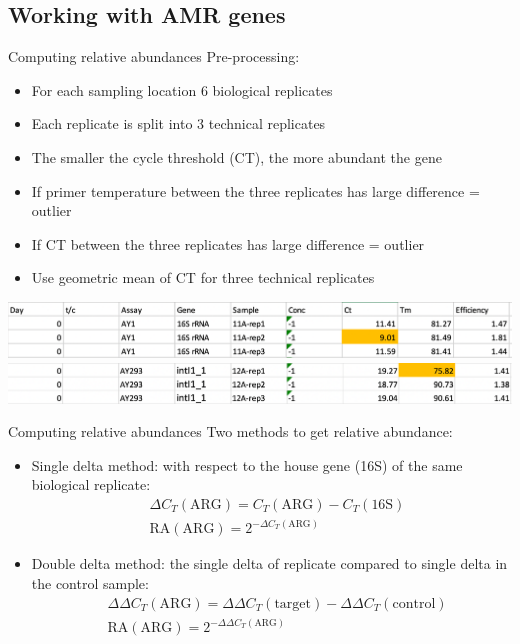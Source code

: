 \documentclass[mathserif,11pt]{beamer}
\begin{document}
\subsection{Working with AMR genes}
\begin{frame}{Computing relative abundances}
Pre-processing:
\begin{itemize}
	\item For each sampling location 6 biological replicates
	\item Each replicate is split into 3 technical replicates
	\item The smaller the cycle threshold (CT), the more abundant the gene
	\item If primer temperature between the three replicates has large difference = outlier
	\item If CT between the three replicates has large difference = outlier
	\item Use geometric mean of CT for three technical replicates
\end{itemize}
\includegraphics[width=\textwidth]{Figures/example_rtpcr.png}
\includegraphics[width=\textwidth]{Figures/example_rtpcr_tm.png}
\end{frame}
\begin{frame}{Computing relative abundances}
Two methods to get relative abundance:
	\begin{itemize}
	\item Single delta method: with respect to the house gene (16S) of the same biological replicate:	
			\begin{align*}
			&\Delta C_{T}(\text{ARG}) = C_{T}(\text{ARG}) - C_{T}(\text{16S})\\
			& \text{RA}(\text{ARG}) = 2^{-\Delta C_{T}(\text{ARG})}
			\end{align*}
	\item Double delta method: the single delta of replicate compared to single delta in the control sample:
			\begin{align*}
			&\Delta \Delta C_{T}(\text{ARG}) = \Delta \Delta C_{T}(\text{target}) - \Delta \Delta C_{T}(\text{control}) \\
			& \text{RA}(\text{ARG}) = 2^{-\Delta \Delta C_{T}(\text{ARG})}
			\end{align*}
\end{itemize}
\end{frame}
\end{document}

